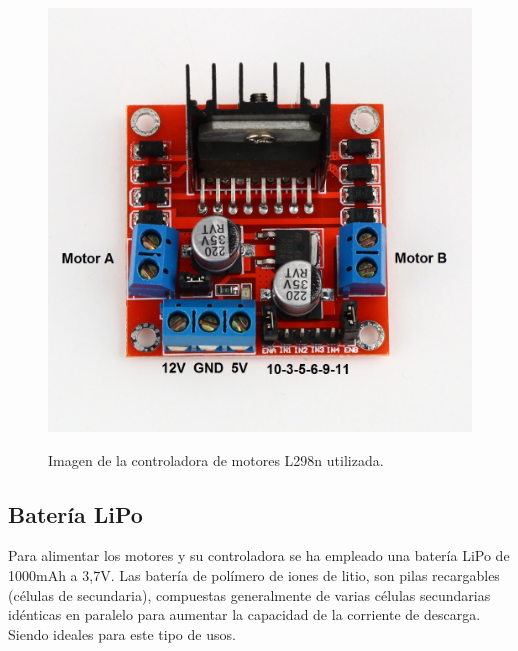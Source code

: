 \begin{figure}[H]
  \begin{center}
    \includegraphics[scale=0.8]{imagenes/l298n.jpg}\\
    \caption{Imagen de la controladora de motores L298n utilizada.}
  \end{center}
\end{figure}



\subsection{ Batería LiPo }

Para alimentar los motores y su controladora se ha empleado una batería LiPo de 1000mAh a 3,7V. Las batería de polímero de iones de litio, son pilas recargables (células de secundaria), compuestas generalmente de varias células secundarias idénticas en paralelo para aumentar la capacidad 
de la corriente de descarga. Siendo ideales para este tipo de usos.

